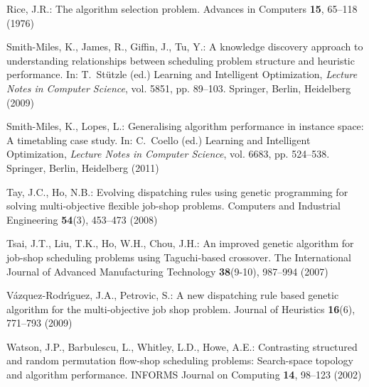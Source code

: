 \documentclass[graybox]{svmult}
\begin{document}
\begin{thebibliography}{10}
    Rice, J.R.: The algorithm selection problem.
    \newblock Advances in Computers \textbf{15}, 65--118 (1976)
    
    Smith-Miles, K., James, R., Giffin, J., Tu, Y.: A knowledge discovery 
    approach to understanding relationships between scheduling problem 
    structure and heuristic performance.
    \newblock In: T.~Stützle (ed.) Learning and Intelligent Optimization,
    \emph{Lecture Notes in Computer Science}, vol. 5851, pp. 89--103. Springer,
    Berlin, Heidelberg (2009)
    
    Smith-Miles, K., Lopes, L.: Generalising algorithm performance in instance
    space: A timetabling case study.
    \newblock In: C.~Coello (ed.) Learning and Intelligent Optimization,
    \emph{Lecture Notes in Computer Science}, vol. 6683, pp. 524--538. Springer,
    Berlin, Heidelberg (2011)
    
    Tay, J.C., Ho, N.B.: Evolving dispatching rules using genetic programming 
    for solving multi-objective flexible job-shop problems.
    \newblock Computers and Industrial Engineering \textbf{54}(3), 453--473 
    (2008)
    
    Tsai, J.T., Liu, T.K., Ho, W.H., Chou, J.H.: {An improved genetic 
    algorithm  for job-shop scheduling problems using Taguchi-based crossover}.
    \newblock The International Journal of Advanced Manufacturing Technology
    \textbf{38}(9-10), 987--994 (2007)
    
    V\'{a}zquez-Rodr\'{\i}guez, J.A., Petrovic, S.: {A new dispatching rule  
    based genetic algorithm for the multi-objective job shop problem}.
    \newblock Journal of Heuristics \textbf{16}(6), 771--793 (2009)
    
    Watson, J.P., Barbulescu, L., Whitley, L.D., Howe, A.E.: Contrasting 
    structured and random permutation flow-shop scheduling problems: 
    Search-space topology and algorithm performance.
    \newblock INFORMS Journal on Computing \textbf{14}, 98--123 (2002)
    
\end{thebibliography}
\end{document}
